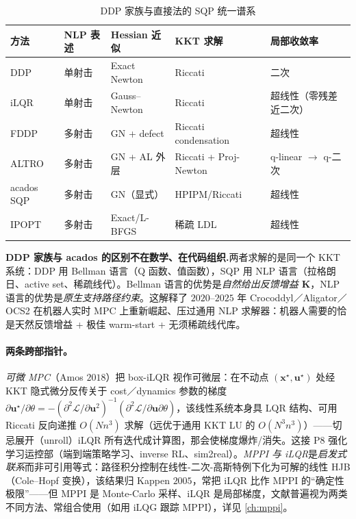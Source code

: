 \begin{table}[H]\centering\small
\caption{DDP 家族与直接法的 SQP 统一谱系}
\label{tab:ddp-sqp}
\begin{tabular}{lllll}
\toprule
方法 & NLP 表述 & Hessian 近似 & KKT 求解 & 局部收敛率 \\
\midrule
DDP & 单射击 & Exact Newton & Riccati & 二次 \\
iLQR & 单射击 & Gauss--Newton & Riccati & 超线性（零残差近二次）\\
FDDP & 多射击 & GN + defect & Riccati condensation & 超线性 \\
ALTRO & 多射击 & GN + AL 外层 & Riccati + Proj-Newton & q-linear $\to$ q-二次 \\
acados SQP & 多射击 & GN（显式） & HPIPM/Riccati & 超线性 \\
IPOPT & 多射击 & Exact/L-BFGS & 稀疏 LDL & 超线性 \\
\bottomrule
\end{tabular}
\end{table}

\begin{insight}
\textbf{DDP 家族与 acados 的区别不在数学、在代码组织.}\;两者求解的是同一个 KKT 系统：DDP 用 Bellman 语言（Q 函数、值函数），SQP 用 NLP 语言（拉格朗日、active set、稀疏线代）。Bellman 语言的优势是\emph{自然给出反馈增益 $\mathbf{K}$}，NLP 语言的优势是\emph{原生支持路径约束}。这解释了 $2020$--$2025$ 年 Crocoddyl／Aligator／OCS2 在机器人实时 MPC 上重新崛起、压过通用 NLP 求解器：机器人需要的恰是天然反馈增益 + 极佳 warm-start + 无须稀疏线代库。
\end{insight}

\paragraph{两条跨部指针。}\;
\emph{可微 MPC}（Amos $2018$\cite{amos2018diffmpc}）把 box-iLQR 视作可微层：在不动点 $(\mathbf{x}^\star,\mathbf{u}^\star)$ 处经 KKT 隐式微分反传关于 cost／dynamics 参数的梯度 $\partial\mathbf{u}^\star/\partial\theta=-(\partial^2\mathcal{L}/\partial\mathbf{u}^2)^{-1}(\partial^2\mathcal{L}/\partial\mathbf{u}\partial\theta)$，该线性系统本身具 LQR 结构、可用 Riccati 反向递推 $O(Nn^3)$ 求解（远优于通用 KKT LU 的 $O(N^3n^3)$）——切忌展开（unroll）iLQR 所有迭代成计算图，那会使梯度爆炸/消失。这接 P8 强化学习运控部（端到端策略学习、inverse RL、sim2real）。\emph{MPPI 与 iLQR}是\emph{启发式联系}而非可引用等式：路径积分控制在线性-二次-高斯特例下化为可解的线性 HJB（Cole--Hopf 变换），该结果归 Kappen $2005$\cite{kappen2005linear}，常把 iLQR 比作 MPPI 的“确定性极限”——但 MPPI 是 Monte-Carlo 采样、iLQR 是局部梯度，文献普遍视为两类不同方法、常组合使用（如用 iLQG 跟踪 MPPI），详见 \cref{ch:mppi}。

